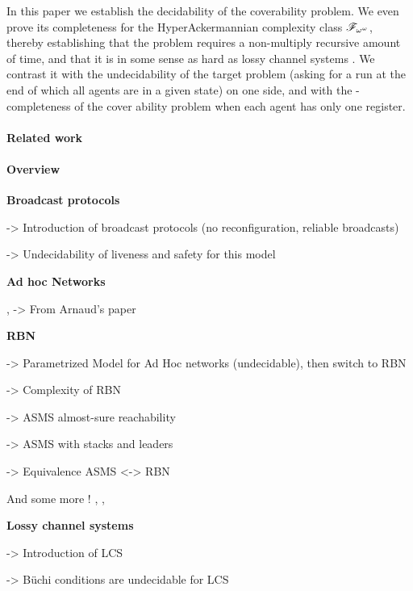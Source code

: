 In this paper we establish the decidability of the coverability problem. We even prove its completeness for the HyperAckermannian complexity class $\mathscr{F}_{\omega^\omega}$, thereby establishing that the problem requires a non-multiply recursive amount of time, and that it is in some sense as hard as lossy channel systems . 
We contrast it with the undecidability of the target problem (asking for a run at the end of which all agents are in a given state) on one side, and with the \NP-completeness of the cover ability problem when each agent has only one register. 

\paragraph*{Related work}


\paragraph*{Overview}



	\textbf{Broadcast protocols}

	\cite{emerson1998model} -> Introduction of broadcast protocols (no reconfiguration, reliable broadcasts)
	
	\cite{EsparzaFM1999verification} -> Undecidability of liveness and safety for this model

	\textbf{Ad hoc Networks}

	\cite{Godskesen2007calculus}, \cite{Merro2007observational} -> From Arnaud's paper

	\textbf{RBN}
	
	\cite{DelzannoSZ2010Adhoc} -> Parametrized Model for Ad Hoc networks (undecidable), then switch to RBN
	
	\cite{Delzanno2012complexity} -> Complexity of RBN
	
	\cite{BouyerMRSS2016} -> ASMS almost-sure reachability
	
	\cite{fortin2017model} -> ASMS with stacks and leaders
	
	\cite{BalaW2021} -> Equivalence ASMS <-> RBN
	
	And some more ! \cite{BalasubramanianBM2018parameterized}, \cite{BalasubramanianGW2022parameterized}, 	\cite{ChiniMS2019liveness} 
	
	\textbf{Lossy channel systems}
	
	\cite{AbdullaJ1996verif} -> Introduction of LCS
	
	\cite{AbdullaJ1996undec} -> Büchi conditions are undecidable for LCS 
	
